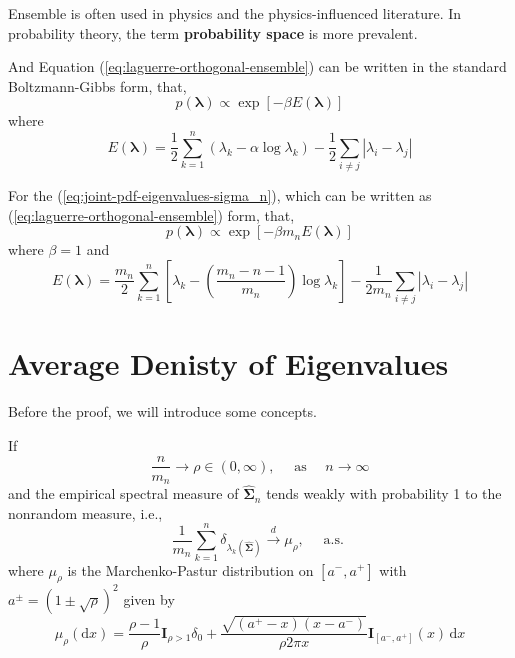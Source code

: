 \begin{remark}
    Ensemble is often used in physics and the physics-influenced literature. In probability theory, the term \textbf{probability space} is more prevalent.
\end{remark}

And Equation (\ref{eq:laguerre-orthogonal-ensemble}) can be written in the standard Boltzmann-Gibbs form, that,
\begin{equation*}
    p\left(\boldsymbol{\lambda}\right)\propto\exp\left[-\beta E\left(\boldsymbol{\lambda}\right)\right]
\end{equation*}
where
\begin{equation}
    E\left(\boldsymbol{\lambda}\right)=\frac{1}{2}\sum_{k=1}^{n}\left(\lambda_{k}-\alpha\log\lambda_{k}\right)-\frac{1}{2}\sum_{i\neq j}\left|\lambda_{i}-\lambda_{j}\right|
\end{equation}

For the (\ref{eq:joint-pdf-eigenvalues-sigma_n}), which can be written as (\ref{eq:laguerre-orthogonal-ensemble}) form, that,
\begin{equation*}
    p\left(\boldsymbol{\lambda}\right)\propto\exp\left[-\beta m_{n}E\left(\boldsymbol{\lambda}\right)\right]
\end{equation*}
where $\beta=1$ and
\begin{equation*}
    E\left(\boldsymbol{\lambda}\right)=\frac{m_{n}}{2}\sum_{k=1}^{n}\left[\lambda_{k}-\left(\frac{m_{n}-n-1}{m_{n}}\right)\log\lambda_{k}\right]-\frac{1}{2m_{n}}\sum_{i\neq j}\left|\lambda_{i}-\lambda_{j}\right|
\end{equation*}

\section{Average Denisty of  Eigenvalues}

Before the proof, we will introduce some concepts.


\begin{theorem}
    If
    \begin{equation*}
        \frac{n}{m_{n}}\rightarrow\rho\in(0,\infty),\quad\text{ as }\quad n\rightarrow\infty
    \end{equation*}
    and the empirical spectral measure of $\widehat{\boldsymbol{\Sigma}}_{n}$ tends weakly with probability 1 to the nonrandom measure, i.e.,
    \begin{equation}
        \frac{1}{m_{n}}\sum_{k=1}^{n}\delta_{\lambda_{k}(\widehat{\boldsymbol{\Sigma}})}\stackrel{d}{\rightarrow}\mu_{\rho},\quad\text{ a.s. }
    \end{equation}
    where $\mu_{\rho}$ is the Marchenko-Pastur distribution on $\left[a^{-},a^{+}\right]$ with $a^{\pm}=(1\pm\sqrt{\rho})^{2}$ given by
    \begin{equation}
        \mu_{\rho}(\mathrm{d}x)=\frac{\rho-1}{\rho}\mathbf{I}_{\rho>1}\delta_{0}+\frac{\sqrt{\left(a^{+}-x\right)\left(x-a^{-}\right)}}{\rho 2\pi x}\mathbf{I}_{\left[a^{-},a^{+}\right]}(x)\,\mathrm{d}x
    \end{equation}
\end{theorem}


